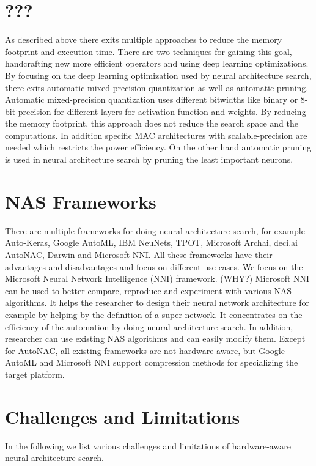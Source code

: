 \documentclass[conference]{IEEEtran}
\begin{document}
\section{???}

As described above there exits multiple approaches to reduce the memory footprint and execution time. There are two techniques for gaining this goal, handcrafting new more efficient operators and using deep learning optimizations. By focusing on the deep learning optimization used by neural architecture search, there exits automatic mixed-precision quantization as well as automatic pruning. Automatic mixed-precision quantization uses different bitwidths like binary or 8-bit precision for different layers for activation function and weights. By reducing the memory footprint, this approach does not reduce the search space and the computations. In addition specific MAC architectures with scalable-precision are needed which restricts the power efficiency. On the other hand automatic pruning is used in neural architecture search by pruning the least important neurons. 

\section{NAS Frameworks}

There are multiple frameworks for doing neural architecture search, for example Auto-Keras, Google AutoML, IBM NeuNets, TPOT, Microsoft Archai, deci.ai AutoNAC, Darwin and Microsoft NNI. All these frameworks have their advantages and disadvantages and focus on different use-cases. We focus on the Microsoft Neural Network Intelligence (NNI) framework. (WHY?) Microsoft NNI can be used to better compare, reproduce and experiment with various NAS algorithms. It helps the researcher to design their neural network architecture for example by helping by the definition of a super network. It concentrates on the efficiency of the automation by doing neural architecture search. In addition, researcher can use existing NAS algorithms and can easily modify them. Except for AutoNAC, all existing frameworks are not hardware-aware, but Google AutoML and Microsoft NNI support compression methods for specializing the target platform. 

\section{Challenges and Limitations}

In the following we list various challenges and limitations of hardware-aware neural architecture search. 
\end{document}
